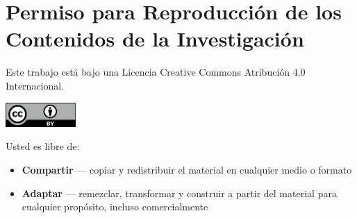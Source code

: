 \documentclass[11pt,letterpaper]{report}
\begin{document}
\cleardoublepage
{}
{}


\cleardoublepage
{}
{}


\cleardoublepage
{}
{}


\chapter*{Permiso para Reproducción de los Contenidos de la Investigación}

Este trabajo está bajo una Licencia Creative Commons Atribución 4.0 Internacional.

\begin{center}
\includegraphics[width=0.2\textwidth]{images/cc-by.png}
\end{center}

Usted es libre de:
\begin{itemize}
    \item \textbf{Compartir} — copiar y redistribuir el material en cualquier medio o formato
    \item \textbf{Adaptar} — remezclar, transformar y construir a partir del material para cualquier propósito, incluso comercialmente
\end{itemize}
\end{document}
